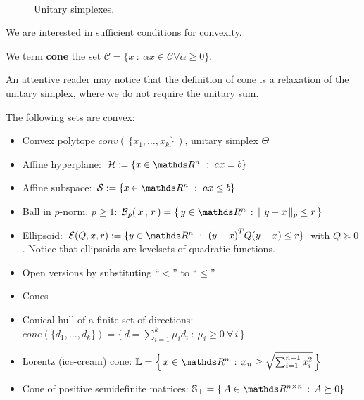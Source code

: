 \documentclass[computationalMathematics.tex]{subfiles}
\begin{document}
\begin{figure}[h]
  \centering
  \hspace{0.5cm}
  \\
  \caption{Unitary simplexes.}\label{fig:5ott_2}
\end{figure}


We are interested in sufficient conditions for convexity.

\begin{definition}[Cone]
  We term \textbf{cone} the set $\mathcal{C} = \{x~:~\alpha x \in \mathcal{C}\forall\alpha \geq 0\}$.
\end{definition}

An attentive reader may notice that the definition of cone is a relaxation of the unitary simplex, where we do not require the unitary sum.

The following sets are convex:
\begin{itemize}
  \item Convex polytope $conv( \, \{x_1, \ldots, x_k\} \, )$, unitary simplex $\Theta$
  \item Affine hyperplane: $\mathcal{H} := \{x \in \R^n~:~ax = b\}$
  \item Affine subspace: $\mathcal{S} := \{x \in \R^n~:~ ax \leq b\}$
  \item Ball in $p$-norm, $p \geq 1$: $\mathcal{B}_p( \, x \,,\, r \, ) = \{ \, y \in \R^n \,:\, \| \, y - x \, \|_p \leq r \,\}$
  \item Ellipsoid: $\mathcal{E}(Q,x,r) := \{y \in \R^n~:~\tr{(y - x)}Q(y - x) \leq r\}$  with $Q \succeq 0$. Notice that ellipsoids are levelsets of quadratic functions.
  \item Open versions by substituting ``$<$'' to ``$\leq$''
  \item Cones
  \item Conical hull of a finite set of directions: $cone(\{d_1, \ldots, d_k\}) = \Big\{ \, d = \sum\limits_{i=1}^k \mu_i d_i~:~\mu_i \geq 0~\forall \, i \, \Big\}$
  \item Lorentz (ice-cream) cone: $\mathbb{L} = \Big\{ \, x \in \R^n \,:\, x_n \geq \sqrt{\sum_{i=1}^{n-1} x_i^2} \, \Big\}$
  \item Cone of positive semidefinite matrices: $\mathbb{S}_+ = \{ \, A \in \R^{n \times n} \,:\, A \succeq 0\}$
\end{itemize}
\end{document}
